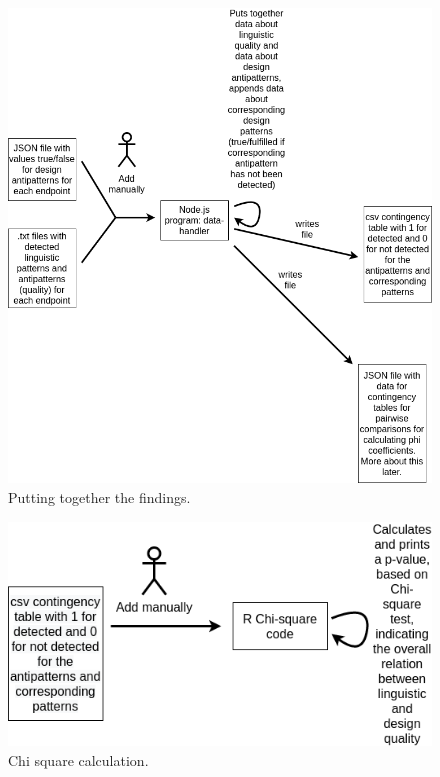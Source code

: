 \documentclass[a4paper,12pt]{article}
\begin{document}
\begin{figure}[ht!]
    \centering
    \includegraphics[scale=0.5]{Template_report_LaTeX_EN/img/method_figures/data_handler.png}
    \caption{Putting together the findings.}
    \label{fig:Putting together the findings}
\end{figure}

\begin{figure}[ht!]
    \centering
    \includegraphics[scale=0.5]{Template_report_LaTeX_EN/img/method_figures/R_Chi_square.png}
    \caption{Chi square calculation.}
    \label{fig:R chi square calculation}
\end{figure}
\end{document}
